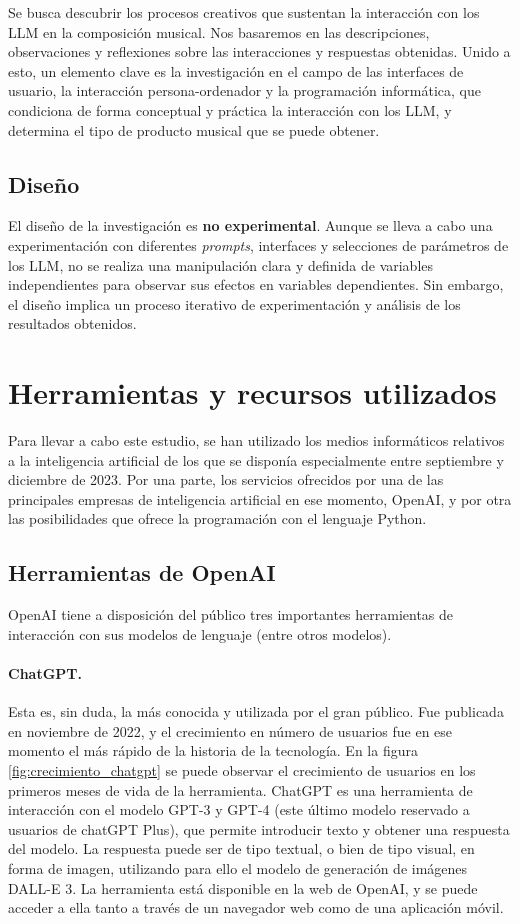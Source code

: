 Se busca descubrir los procesos creativos que sustentan la interacción con los LLM en la composición musical. Nos basaremos en las descripciones, observaciones y reflexiones sobre las interacciones y respuestas obtenidas. Unido a esto, un elemento clave es la investigación en el campo de las interfaces de usuario, la interacción persona-ordenador y la programación informática, que condiciona de forma conceptual y práctica la interacción con los LLM, y determina el tipo de producto musical que se puede obtener.

\subsection{Diseño}
El diseño de la investigación es \textbf{no experimental}. Aunque se lleva a cabo una experimentación con diferentes \emph{prompts}, interfaces y selecciones de parámetros de los LLM, no se realiza una manipulación clara y definida de variables independientes para observar sus efectos en variables dependientes. Sin embargo, el diseño implica un proceso iterativo de experimentación y análisis de los resultados obtenidos.

\section{Herramientas y recursos utilizados}

Para llevar a cabo este estudio, se han utilizado los medios informáticos relativos a la inteligencia artificial de los que se disponía especialmente entre septiembre y diciembre de 2023. Por una parte, los servicios ofrecidos por una de las principales empresas de inteligencia artificial en ese momento, OpenAI, y por otra las posibilidades que ofrece la programación con el lenguaje Python. 

    \subsection{Herramientas de OpenAI}

    OpenAI tiene a disposición del público tres importantes herramientas de interacción con sus modelos de lenguaje (entre otros modelos). 

        \paragraph{ChatGPT.} Esta es, sin duda, la más conocida y utilizada por el gran público. Fue publicada en noviembre de 2022, y el crecimiento en número de usuarios fue en ese momento el más rápido de la historia de la tecnología. En la figura \ref{fig:crecimiento_chatgpt} se puede observar el crecimiento de usuarios en los primeros meses de vida de la herramienta. ChatGPT es una herramienta de interacción con el modelo GPT-3 y GPT-4 (este último modelo reservado a usuarios de chatGPT Plus), que permite introducir texto y obtener una respuesta del modelo. La respuesta puede ser de tipo textual, o bien de tipo visual, en forma de imagen, utilizando para ello el modelo de generación de imágenes DALL-E 3. La herramienta está disponible en la web de OpenAI, y se puede acceder a ella tanto a través de un navegador web como de una aplicación móvil.

